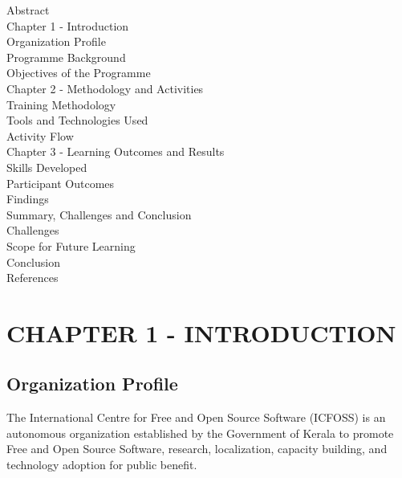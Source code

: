\documentclass[12pt, a4paper]{article}
\begin{document}
\vspace{1em}

\noindent
\colorbox{tableblue}{%
}

\vspace{1em}

\noindent Abstract \hfill \pageref{sec:abstract} \\
Chapter 1 - Introduction \hfill \pageref{chap1} \\
Organization Profile \hfill \pageref{chap1} \\
Programme Background \hfill \pageref{chap1} \\
Objectives of the Programme \hfill \pageref{chap1} \\
Chapter 2 - Methodology and Activities \hfill \pageref{chap2} \\
Training Methodology \hfill \pageref{chap2} \\
Tools and Technologies Used \hfill \pageref{chap2} \\
Activity Flow \hfill \pageref{chap2} \\
Chapter 3 - Learning Outcomes and Results \hfill \pageref{chap3} \\
Skills Developed \hfill \pageref{chap3} \\
Participant Outcomes \hfill \pageref{chap3} \\
Findings \hfill \pageref{chap3} \\
Summary, Challenges and Conclusion \hfill \pageref{chap4} \\
Challenges \hfill \pageref{chap4} \\
Scope for Future Learning \hfill \pageref{chap4} \\
Conclusion \hfill \pageref{chap4} \\
References \hfill \pageref{chap4}

\newpage

\label{sec:abstract}
\section{CHAPTER 1 - INTRODUCTION}\label{chap1}

\subsection{Organization Profile}
The International Centre for Free and Open Source Software (ICFOSS) is an autonomous organization established by the Government of Kerala to promote Free and Open Source Software, research, localization, capacity building, and technology adoption for public benefit.
\end{document}
